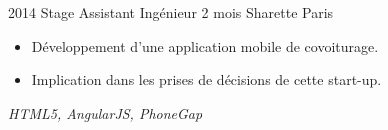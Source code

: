 \cventry
    {2014}
    {Stage Assistant Ingénieur}
    {2 mois}
    {Sharette}
    {Paris}
    {
        \begin{itemize}
            \item Développement d'une application mobile de covoiturage.
        \item Implication dans les prises de décisions de cette start-up.
        \end{itemize}
        \vspace*{1mm}
        \textit{HTML5, AngularJS, PhoneGap}
    }
\vspace*{0.2cm}